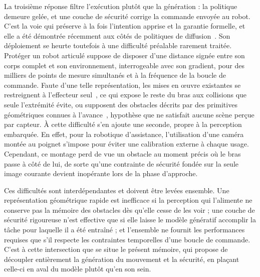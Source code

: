 La troisième réponse filtre l'exécution plutôt que la génération : la politique demeure gelée, et une couche de sécurité corrige la commande envoyée au robot. C'est la voie qui préserve à la fois l'intention apprise et la garantie formelle, et elle a été démontrée récemment aux côtés de politiques de diffusion~\cite{Rmer2026From}. Son déploiement se heurte toutefois à une difficulté préalable rarement traitée. Protéger un robot articulé suppose de disposer d'une distance signée entre son corps complet et son environnement, interrogeable avec son gradient, pour des milliers de points de mesure simultanés et à la fréquence de la boucle de commande. Faute d'une telle représentation, les mises en œuvre existantes se restreignent à l'effecteur seul~\cite{Dai2025Safeflow}, ce qui expose le reste du bras aux collisions que seule l'extrémité évite, ou supposent des obstacles décrits par des primitives géométriques connues à l'avance~\cite{Dai2025Safeflow,Rmer2026From}, hypothèse que ne satisfait aucune scène perçue par capteur. À cette difficulté s'en ajoute une seconde, propre à la perception embarquée. En effet, pour la robotique d'assistance, l'utilisation d'une caméra montée au poignet s'impose pour éviter une calibration externe à chaque usage. Cependant, ce montage perd de vue un obstacle au moment précis où le bras passe à côté de lui, de sorte qu'une contrainte de sécurité fondée sur la seule image courante devient inopérante lors de la phase d'approche.

Ces difficultés sont interdépendantes et doivent être levées ensemble. Une représentation géométrique rapide est inefficace si la perception qui l'alimente ne conserve pas la mémoire des obstacles dès qu'elle cesse de les voir ; une couche de sécurité rigoureuse n'est effective que si elle laisse le modèle génératif accomplir la tâche pour laquelle il a été entraîné ; et l'ensemble ne fournit les performances requises que s'il respecte les contraintes temporelles d'une boucle de commande. C'est à cette intersection que se situe le présent mémoire, qui propose de découpler entièrement la génération du mouvement et la sécurité, en plaçant celle-ci en aval du modèle plutôt qu'en son sein.

